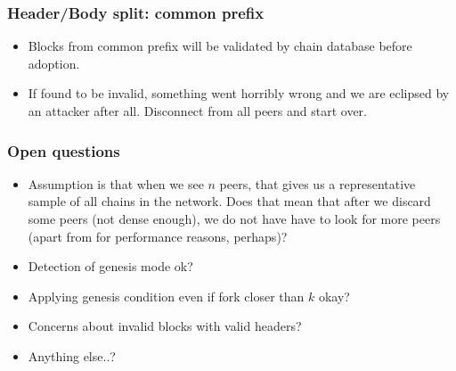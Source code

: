 \documentclass[usenames,dvipsnames,t]{beamer}
\begin{document}
\begin{frame}

\frametitle{Header/Body split: common prefix}

\begin{center}
\end{center}

\begin{itemize}
\item Blocks from common prefix will be validated by chain database before adoption.
\item If found to be invalid, something went horribly wrong and we are eclipsed by
an attacker after all. Disconnect from all peers and start over.
\end{itemize}

\end{frame}


\begin{frame}

\frametitle{Open questions}

\begin{itemize}
\item Assumption is that when we see $n$ peers, that gives us a representative sample of all chains in the network. Does that mean that after we discard some peers (not dense enough), we do not have have to look for more peers (apart from for performance reasons, perhaps)?
\item Detection of genesis mode ok?
\item Applying genesis condition even if fork closer than $k$ okay?
\item Concerns about invalid blocks with valid headers?
\item Anything else..?
\end{itemize}

\end{frame}
\end{document}
